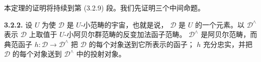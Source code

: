 本定理的证明将持续到第 (3.2.9) 段。我们先证明三个中间命题。

\medskip
\noindent\textbf{3.2.2.}\quad
设 $U$ 为使 $\mathcal D$ 是 $U$-小范畴的宇宙，也就是说，
$\mathcal D$ 是 $U$ 的一个元素。以 $\mathcal D^\wedge$
表示 $\mathcal D$ 上取值于 $U$-小阿贝尔群范畴的反变加法函子范畴。
$\mathcal D^\wedge$ 是阿贝尔范畴，而典范函子
$h\colon\mathcal D\to\mathcal D^\wedge$ 把 $\mathcal D$ 的每个对象送到它所表示的函子；
$h$ 充分忠实，并把 $\mathcal D$ 的每个对象送到
$\mathcal D^\wedge$ 中的投射对象。
\endgroup
